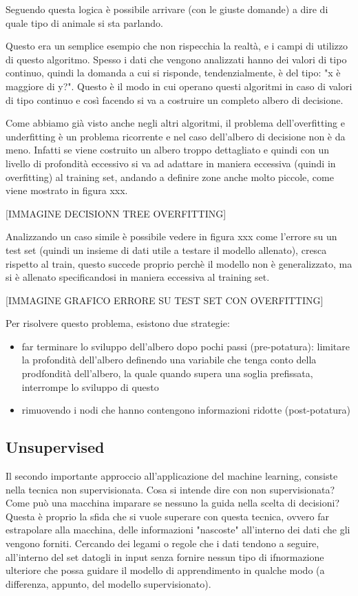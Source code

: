 \documentclass[12pt,italian]{report}
\begin{document}
Seguendo questa logica è possibile arrivare (con le giuste domande) a dire di quale tipo di animale si sta parlando.

Questo era un semplice esempio che non rispecchia la realtà, e i campi di utilizzo di questo algoritmo. Spesso i dati che vengono analizzati hanno dei valori di tipo continuo, quindi la domanda a cui si risponde, tendenzialmente, è del tipo: "x è maggiore di y?". Questo è il modo in cui operano questi algoritmi in caso di valori di tipo continuo e così facendo si va a costruire un completo albero di decisione.

Come abbiamo già visto anche negli altri algoritmi, il problema dell'overfitting e underfitting è un problema ricorrente e nel caso dell'albero di decisione non è da meno.
Infatti se viene costruito un albero troppo dettagliato e quindi con un livello di profondità eccessivo si va ad adattare in maniera eccessiva (quindi in overfitting) al training set, andando a definire zone anche molto piccole, come viene mostrato in figura xxx.

[IMMAGINE DECISIONN TREE OVERFITTING]

Analizzando un caso simile è possibile vedere in figura xxx come l'errore su un test set (quindi un insieme di dati utile a testare il modello allenato), cresca rispetto al train, questo succede proprio perchè il modello non è generalizzato, ma si è allenato specificandosi in maniera eccessiva al training set.

[IMMAGINE GRAFICO ERRORE SU TEST SET CON OVERFITTING]

Per risolvere questo problema, esistono due strategie:
\begin{itemize}
	\item far terminare lo sviluppo dell'albero dopo pochi passi (pre-potatura): limitare la profondità dell'albero definendo una variabile che tenga conto della prodfondità dell'albero, la quale quando supera una soglia prefissata, interrompe lo sviluppo di questo
	
	\item rimuovendo i nodi che hanno contengono informazioni ridotte (post-potatura)
\end{itemize}

\pagebreak
\subsection{Unsupervised}
Il secondo importante approccio all'applicazione del machine learning, consiste nella tecnica non supervisionata. Cosa si intende dire con non supervisionata? Come può una macchina imparare se nessuno la guida nella scelta di decisioni?
Questa è proprio la sfida che si vuole superare con questa tecnica, ovvero far estrapolare alla macchina, delle informazioni "nascoste" all'interno dei dati che gli vengono forniti. Cercando dei legami o regole che i dati tendono a seguire, all'interno del set datogli in input senza fornire nessun tipo di ifnormazione ulteriore che possa guidare il modello di apprendimento in qualche modo (a differenza, appunto, del modello supervisionato).
\end{document}
